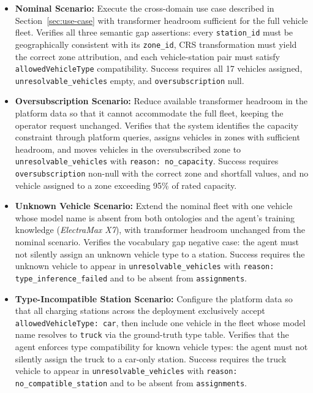 \begin{itemize}
    \item \textbf{Nominal Scenario:}
    Execute the cross-domain use case described in Section~\ref{sec:use-case}
        with transformer headroom sufficient for the full vehicle fleet.
    Verifies all three semantic gap assertions:
        every \texttt{station\_id} must be geographically consistent with its \texttt{zone\_id},
        CRS transformation must yield the correct zone attribution,
        and each vehicle-station pair must satisfy \texttt{allowedVehicleType} compatibility.
    Success requires all 17 vehicles assigned,
        \texttt{unresolvable\_vehicles} empty, and \texttt{oversubscription} null.

    \item \textbf{Oversubscription Scenario:}
    Reduce available transformer headroom in the platform data so that it
        cannot accommodate the full fleet,
        keeping the operator request unchanged.
    Verifies that the system identifies the capacity constraint through platform queries,
        assigns vehicles in zones with sufficient headroom,
        and moves vehicles in the oversubscribed zone to
        \texttt{unresolvable\_vehicles} with \texttt{reason: no\_capacity}.
    Success requires \texttt{oversubscription} non-null with the correct zone
        and shortfall values, and no vehicle assigned to a zone exceeding
        95\% of rated capacity.

    \item \textbf{Unknown Vehicle Scenario:}
    Extend the nominal fleet with one vehicle whose model name is absent
        from both ontologies and the agent's training knowledge
        (\textit{ElectraMax X7}),
        with transformer headroom unchanged from the nominal scenario.
    Verifies the vocabulary gap negative case:
        the agent must not silently assign an unknown vehicle type to a station.
    Success requires the unknown vehicle to appear in \texttt{unresolvable\_vehicles}
        with \texttt{reason: type\_inference\_failed}
        and to be absent from \texttt{assignments}.

    \item \textbf{Type-Incompatible Station Scenario:}
    Configure the platform data so that all charging stations across the deployment
        exclusively accept \texttt{allowedVehicleType: car},
        then include one vehicle in the fleet whose model name resolves to
        \texttt{truck} via the ground-truth type table.
    Verifies that the agent enforces type compatibility for known vehicle types:
        the agent must not silently assign the truck to a car-only station.
    Success requires the truck vehicle to appear in \texttt{unresolvable\_vehicles}
        with \texttt{reason: no\_compatible\_station}
        and to be absent from \texttt{assignments}.


\end{itemize}
